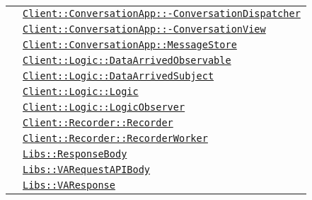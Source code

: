 \begin{longtable}{|>{\centering}m{3cm}|m{10cm}<{\centering}|}
& \hyperref[Client::ConversationApp::ConversationDispatcher]{\texttt{Client::ConversationApp::-\linebreak ConversationDispatcher}}\\
& \hyperref[Client::ConversationApp::ConversationView]{\texttt{Client::ConversationApp::-\linebreak ConversationView}}\\
& \hyperref[Client::ConversationApp::MessageStore]{\texttt{Client::ConversationApp::MessageStore}}\\
& \hyperref[Client::Logic::DataArrivedObservable]{\texttt{Client::Logic::DataArrivedObservable}}\\
& \hyperref[Client::Logic::DataArrivedSubject]{\texttt{Client::Logic::DataArrivedSubject}}\\
& \hyperref[Client::Logic::Logic]{\texttt{Client::Logic::Logic}}\\
& \hyperref[Client::Logic::LogicObserver]{\texttt{Client::Logic::LogicObserver}}\\
& \hyperref[Client::Recorder::Recorder]{\texttt{Client::Recorder::Recorder}}\\
& \hyperref[Client::Recorder::RecorderWorker]{\texttt{Client::Recorder::RecorderWorker}}\\
& \hyperref[Libs::ResponseBody]{\texttt{Libs::ResponseBody}}\\
& \hyperref[Libs::VARequestAPIBody]{\texttt{Libs::VARequestAPIBody}}\\
& \hyperref[Libs::VAResponse]{\texttt{Libs::VAResponse}}\\ \hline


\end{longtable}
